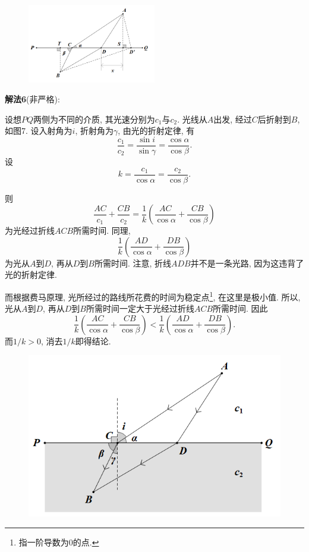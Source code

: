 \documentclass{article}
\begin{document}
\begin{figure}[htbp]
	\centering
	\includegraphics[width=0.5\textwidth]{6.png}
	\caption{}
\end{figure}\par
\textbf{解法6}({\fangsong 非严格}):\par
设想$PQ$两侧为不同的介质, 其光速分别为$c_1$与$c_2$. 光线从$A$出发, 经过$C$后折射到$B$, 如图7. 设入射角为$i$, 折射角为$\gamma$, 由光的折射定律, 有
\[\frac{c_1}{c_2}=\frac{\sin{i}}{\sin{\gamma}}=\frac{\cos{\alpha}}{\cos{\beta}}.\]
设
\[k=\frac{c_1}{\cos{\alpha}}=\frac{c_2}{\cos{\beta}}.\]\par
则
\[\frac{AC}{c_1}+\frac{CB}{c_2}=\frac{1}{k}\left(\frac{AC}{\cos\alpha}+\frac{CB}{\cos\beta}\right)\]
为光经过折线$ACB$所需时间. 同理,
\[\frac{1}{k}\left(\frac{AD}{\cos\alpha}+\frac{DB}{\cos\beta}\right)\]
为光从$A$到$D$, 再从$D$到$B$所需时间. 注意, 折线$ADB$并不是一条光路, 因为这违背了光的折射定律.\par
而根据费马原理, 光所经过的路线所花费的时间为稳定点\footnote{指一阶导数为$0$的点.}, 在这里是极小值. 所以, 光从$A$到$D$, 再从$D$到$B$所需时间一定大于光经过折线$ACB$所需时间. 因此
\[\frac{1}{k}\left(\frac{AC}{\cos\alpha}+\frac{CB}{\cos\beta}\right)<\frac{1}{k}\left(\frac{AD}{\cos\alpha}+\frac{DB}{\cos\beta}\right).\]
而$1/k>0$, 消去$1/k$即得结论.
\begin{figure}[htbp]
	\centering
	\includegraphics[width=0.45\textheight]{7.png}
	\caption{}
\end{figure}
\end{document}

